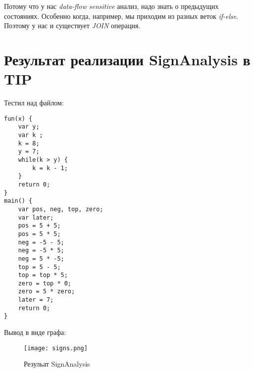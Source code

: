 \documentclass{report}
\begin{document}
Потому что у нас \textit{data-flow sensitive} анализ, надо знать о предыдущих состояниях. Особенно когда, например, мы приходим из разных веток \textit{if-else}. Поэтому у нас и существует \textit{JOIN} операция.

\section{Результат реализации SignAnalysis в TIP}

Тестил над файлом:
\begin{lstlisting}
fun(x) {
    var y;
    var k ;
    k = 8;
    y = 7;
    while(k > y) {
        k = k - 1;
    }
    return 0;
}
main() {
    var pos, neg, top, zero;
    var later;
    pos = 5 + 5;
    pos = 5 * 5;
    neg = -5 - 5;
    neg = -5 * 5;
    neg = 5 * -5;
    top = 5 - 5;
    top = top * 5;
    zero = top * 0;
    zero = 5 * zero;
    later = 7;
    return 0;
}
\end{lstlisting}

Вывод в виде графа:

\begin{figure}
    \centering
    \texttt{[image: signs.png]}
    \caption{Резульат SignAnalysis}
    \label{fig:hi}
\end{figure}


\printbibliography
\end{document}
